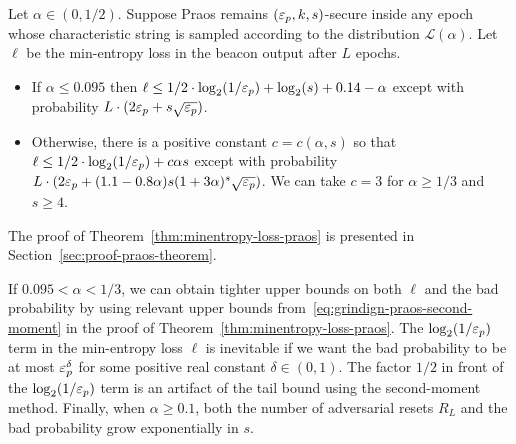 \begin{theorem}\label{thm:minentropy-loss-praos}  
  Let $\alpha \in (0, 1/2)$. 
  Suppose Praos 
  remains $(\mathsf{\varepsilon}_p, k, s)$-secure 
  inside any epoch 
  whose characteristic string is sampled 
  according to the distribution $\mathcal{L}(\alpha)$.
  Let $\ell$ be the min-entropy loss in 
  the beacon output after $L$ epochs. 
  \begin{itemize}
    \item If $\alpha \leq 0.095$ then 
    $\ell \leq 1/2 \cdot \log_2(1/\mathsf{\varepsilon}_p) + \log_2(s) + 0.14 - \alpha$ 
    except with probability $L \cdot (2 \mathsf{\varepsilon}_p + s \sqrt{\mathsf{\varepsilon}_p} )$.

    \item Otherwise, there is a positive constant $c = c(\alpha, s)$ so that 
    $\ell \leq 1/2 \cdot \log_2(1/\mathsf{\varepsilon}_p) 
    + c \alpha s
    $ 
    except with probability $L \cdot (2 \mathsf{\varepsilon}_p + (1.1 - 0.8 \alpha) s (1+3\alpha)^s \sqrt{\mathsf{\varepsilon}_p} )$. 
    We can take $c = 3$ for $\alpha \geq 1/3$ and $s \geq 4$.
  \end{itemize}
\end{theorem}

The proof of Theorem~\ref{thm:minentropy-loss-praos} 
is presented in Section~\ref{sec:proof-praos-theorem}. 

\begin{remark*}
  If $0.095 < \alpha < 1/3$, we can obtain tighter upper bounds on both $\ell$ and the bad probability 
  by using relevant upper bounds from~\eqref{eq:grindign-praos-second-moment} 
  in the proof of Theorem~\ref{thm:minentropy-loss-praos}. 
  The $\log_2(1/\mathsf{\varepsilon}_p)$ term in the min-entropy loss $\ell$ 
  is inevitable if we want 
  the bad probability to be at most $\mathsf{\varepsilon}_p^\delta$ 
  for some positive real constant $\delta \in (0, 1)$. 
  The factor $1/2$ in front of the $\log_2(1/\mathsf{\varepsilon}_p)$ term 
  is an artifact of the tail bound using the second-moment method.
  Finally, when $\alpha \geq 0.1$, 
  both the number of adversarial resets $R_L$
  and the bad probability 
  grow exponentially in $s$.
\end{remark*}



